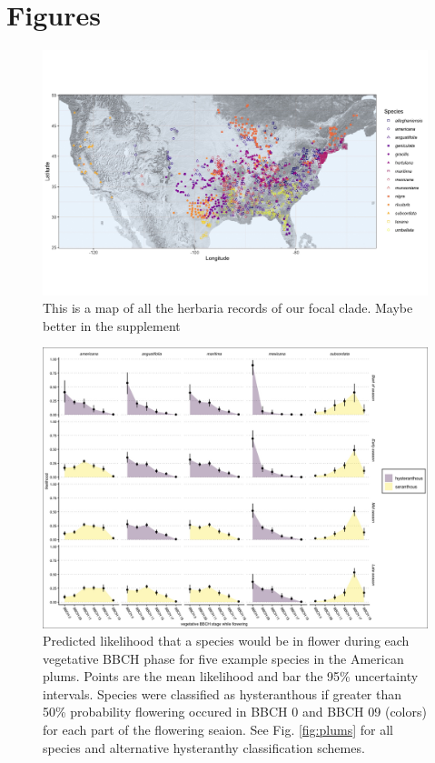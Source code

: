 \documentclass{article}[11pt]
\begin{document}
\section*{Figures}
    \begin{figure}[h!]
    \centering
 \includegraphics[width=\textwidth]{..//..//Plots/Prunus-Map-raster-plasma.jpeg}
    \caption{This is a map of all the herbaria records of our focal clade. Maybe better in the supplement }
    \label{fig:mappy}
\end{figure}

\begin{figure}[h!]
    \centering
 \includegraphics[width=\textwidth]{..//..//Plots/ord_quants_exmpsps.jpeg}
    \caption{Predicted likelihood that a species would be in flower during each vegetative BBCH phase for five example species in the American plums. Points are the mean likelihood and bar the 95\% uncertainty intervals. Species were classified as hysteranthous if greater than 50\% probability flowering occured in BBCH 0 and BBCH 09 (colors) for each part of the flowering seaion.
  See Fig. \ref{fig:plums} for all species and alternative hysteranthy classification schemes. }
    \label{fig:ordinals}
\end{figure}
\end{document}
